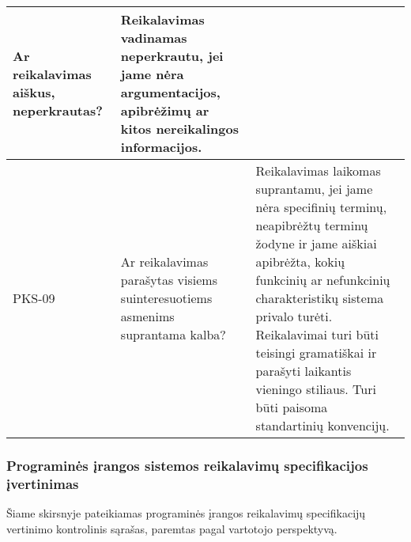 \documentclass{VUMIFPSkursinis}
\begin{document}
\begin{center}
\begin{longtable}{|C{2cm}|L{5cm}|L{8cm}|}
		Ar reikalavimas aiškus, neperkrautas?                                         &
		Reikalavimas vadinamas neperkrautu, jei jame nėra argumentacijos, apibrėžimų ar kitos nereikalingos informacijos.                                                                                                                                                                                                                                                                                                                             \\ \hline
		PKS-09                                                                        &
		Ar reikalavimas parašytas visiems suinteresuotiems asmenims suprantama kalba? &
		Reikalavimas laikomas suprantamu, jei jame nėra specifinių terminų, neapibrėžtų terminų žodyne ir jame aiškiai apibrėžta, kokių funkcinių ar nefunkcinių charakteristikų sistema privalo turėti. Reikalavimai turi būti teisingi gramatiškai ir parašyti laikantis vieningo stiliaus. Turi būti paisoma standartinių konvencijų.                                                                                                              \\ \hline
	\end{longtable}
\end{center}

\subsubsection{Programinės įrangos sistemos reikalavimų specifikacijos įvertinimas}

Šiame skirsnyje pateikiamas programinės įrangos reikalavimų specifikacijų vertinimo kontrolinis sąrašas, paremtas pagal vartotojo perspektyvą.
\end{document}

